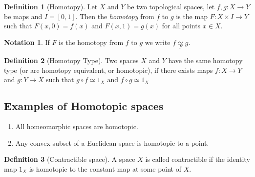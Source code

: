 \documentclass[a4paper, 12pt]{scrartcl}
\theoremstyle{definition}
\newtheorem{defn}{Definition}[section]
\newtheorem*{notn}{Notation}
\newcommand{\lra}{\longrightarrow}
\newcommand{\disp}{\displaystyle}
\newcommand{\htp}[1]{\underset{#1}{\simeq}} %
\begin{document}
    \begin{defn}[Homotopy]
	Let $X$ and $Y$ be two topological spaces, let $f,g : X \lra Y$ be maps and $I = [0,1]$. Then the \textit{homotopy} from $f$ to $g$ is the map $F: X \times I \lra Y$ such that $F(x,0) = f(x)$ and $F(x,1) = g(x)$ for all points $x \in X$.
\end{defn}

\begin{notn}
	If $F$ is the homotopy from $f$ to $g$ we write $\disp f \htp{F} g.$
\end{notn}

\begin{defn}[Homotopy Type]
	Two spaces $X$ and $Y$ have the same homotopy type (or are homotopy equivalent, or homotopic), if there exists maps $f: X \lra Y$ and $g : Y \lra X$ such that $g \circ f \simeq 1_X$ and $f \circ g \simeq 1_X$
\end{defn}

\subsection*{Examples of Homotopic spaces}
\begin{enumerate}
	\item All homeomorphic spaces are homotopic.
	\item Any convex subset of a Euclidean space is homotopic to a point.
\end{enumerate}

\begin{defn}[Contractible space]
	A space $X$ is called contractible if the identity map $1_X$ is homotopic to the constant map at some point of $X$.
\end{defn}
    
    
    
    
    
    
    
    
    
    
    
    
    
    
    
    
\end{document}
